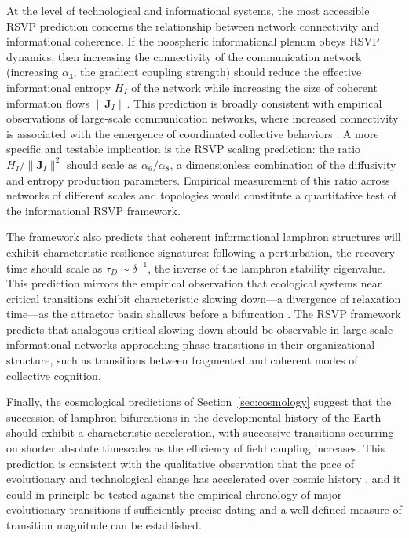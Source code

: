 \documentclass[12pt]{article}
\begin{document}
At the level of technological and informational systems, the most accessible RSVP prediction concerns the relationship between network connectivity and informational coherence. If the noospheric informational plenum obeys RSVP dynamics, then increasing the connectivity of the communication network (increasing $\alpha_3$, the gradient coupling strength) should reduce the effective informational entropy $H_I$ of the network while increasing the size of coherent information flows $\|\mathbf{J}_I\|$. This prediction is broadly consistent with empirical observations of large-scale communication networks, where increased connectivity is associated with the emergence of coordinated collective behaviors \cite{barabasi2016,mitchell2009}. A more specific and testable implication is the RSVP scaling prediction: the ratio $H_I / \|\mathbf{J}_I\|^2$ should scale as $\alpha_6 / \alpha_8$, a dimensionless combination of the diffusivity and entropy production parameters. Empirical measurement of this ratio across networks of different scales and topologies would constitute a quantitative test of the informational RSVP framework.

The framework also predicts that coherent informational lamphron structures will exhibit characteristic resilience signatures: following a perturbation, the recovery time should scale as $\tau_D \sim \delta^{-1}$, the inverse of the lamphron stability eigenvalue. This prediction mirrors the empirical observation that ecological systems near critical transitions exhibit characteristic slowing down---a divergence of relaxation time---as the attractor basin shallows before a bifurcation \cite{bak1996}. The RSVP framework predicts that analogous critical slowing down should be observable in large-scale informational networks approaching phase transitions in their organizational structure, such as transitions between fragmented and coherent modes of collective cognition.

Finally, the cosmological predictions of Section~\ref{sec:cosmology} suggest that the succession of lamphron bifurcations in the developmental history of the Earth should exhibit a characteristic acceleration, with successive transitions occurring on shorter absolute timescales as the efficiency of field coupling increases. This prediction is consistent with the qualitative observation that the pace of evolutionary and technological change has accelerated over cosmic history \cite{smart2009}, and it could in principle be tested against the empirical chronology of major evolutionary transitions if sufficiently precise dating and a well-defined measure of transition magnitude can be established.
\end{document}
